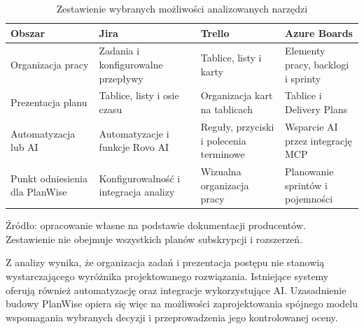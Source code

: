 \begin{table}[htbp]
    \centering
    \caption{Zestawienie wybranych możliwości analizowanych narzędzi}
    \label{tab:porownanie-narzedzi}
    \small
    \begin{tabularx}{\textwidth}{
        >{\raggedright\arraybackslash}p{}
        >{\raggedright\arraybackslash}X
        >{\raggedright\arraybackslash}X
        >{\raggedright\arraybackslash}X}
        \toprule
        \textbf{Obszar} &
        \textbf{Jira} &
        \textbf{Trello} &
        \textbf{Azure Boards} \\
        \midrule

        Organizacja pracy &
        Zadania i konfigurowalne przepływy &
        Tablice, listy i karty &
        Elementy pracy, backlogi i sprinty \\
        \addlinespace

        Prezentacja planu &
        Tablice, listy i osie czasu &
        Organizacja kart na tablicach &
        Tablice i Delivery Plans \\
        \addlinespace

        Automatyzacja lub AI &
        Automatyzacje i funkcje Rovo AI &
        Reguły, przyciski i polecenia terminowe &
        Wsparcie AI przez integrację MCP \\
        \addlinespace

        Punkt odniesienia dla PlanWise &
        Konfigurowalność i integracja analizy &
        Wizualna organizacja pracy &
        Planowanie sprintów i pojemności \\
        \bottomrule
    \end{tabularx}

    \par\smallskip
    \begin{minipage}{\textwidth}
        \footnotesize
        Źródło: opracowanie własne na podstawie dokumentacji producentów.
        Zestawienie nie obejmuje wszystkich planów subskrypcji i rozszerzeń.
    \end{minipage}
\end{table}

Z analizy wynika, że organizacja zadań i prezentacja postępu nie stanowią wystarczającego wyróżnika projektowanego rozwiązania. Istniejące systemy oferują również automatyzację oraz integracje wykorzystujące AI. Uzasadnienie budowy PlanWise opiera się więc na możliwości zaprojektowania spójnego modelu wspomagania wybranych decyzji i przeprowadzenia jego kontrolowanej oceny.

